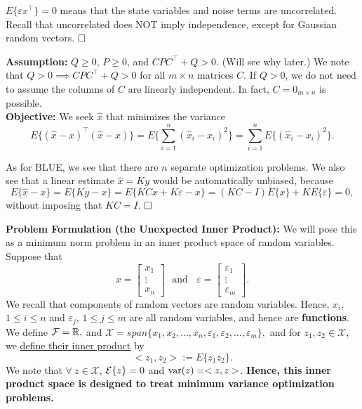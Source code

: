 \begin{rem}
       $E\{\varepsilon x^\top \}=0$ means that the state variables and noise terms are uncorrelated. Recall that uncorrelated does NOT imply independence, except for Gaussian random vectors.
$\hfill \square$  \end{rem} 

\textbf{Assumption:}  $Q\ge 0$, $P \ge 0$, and $CPC^\top +Q >0$.  (Will see why later.) We note that $Q>0 \implies CPC^\top +Q >0$ for all $m \times n$ matrices $C$. If $Q>0$, we do not need to assume the columns of $C$ are linearly independent. In fact, $C = 0_{m \times n}$ is possible.\\

\textbf{Objective:} We seek $\widehat{x}$ that minimizes the variance
$$E\{(\widehat x -x)^\top (\widehat x -x)\} = E\{ \sum\limits_{i=1}^n (\widehat x_i-x_i)^2\} = \sum\limits_{i=1}^n E\{ (\widehat x_i-x_i)^2 \}.$$

\begin{rem} As for BLUE, we see that there are $n$ separate optimization problems.
       We also see that a linear estimate $\widehat x = Ky$ would be automatically unbiased, because
$$ E\{\widehat x - x\}=E\{ Ky - x\} = E\{ KCx+K\varepsilon - x\} = (KC-I) E\{x\}+KE\{\varepsilon\}  = 0,$$
without imposing that $KC = I$. 
$\hfill \square$  \end{rem}


\textbf{Problem Formulation (the Unexpected Inner Product):} We will pose this as a minimum norm problem in an inner product space of random variables. Suppose that 
$$x=   \begin{bmatrix}
    x_1\\
    \vdots\\
    x_n
  \end{bmatrix}~~~\text{and} ~~~~\varepsilon =   \begin{bmatrix}
    \varepsilon_1\\
    \vdots\\
    \varepsilon_m
  \end{bmatrix}.$$
  We recall that components of random vectors are random variables. Hence, $x_i$, $1 \le i \le n$ and $\varepsilon_j$, $1 \le j \le m$ are all random variables, and hence are \textbf{functions}.
  We define ${\cal F} = \mathbb{R},$ and $\mathcal{X} = span\{x_1, x_2, \dots , x_n, \varepsilon_1, \varepsilon_2, \dots, \varepsilon_m\},$ and for  $z_1,z_2 \in \mathcal{X}$, we \underline{define their inner product} by  $$<z_1,z_2> := E\{z_1z_2\}.$$
  We note that $\forall~ z \in \mathcal{X}$, $\mathcal{E}\{z\}=0$ and $\mathrm{var}(z)=<z,z>$. \textbf{Hence, this inner product space is designed to treat minimum variance optimization problems.}
  
